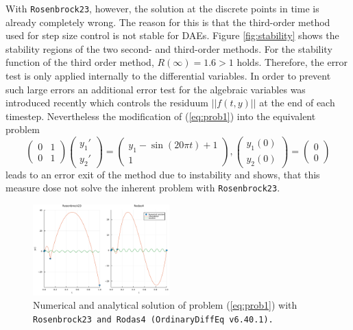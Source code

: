 \documentclass{juliacon}
\begin{document}
With \verb|Rosenbrock23|, however, the solution at the discrete points in time is already completely wrong. 
The reason for this is that the third-order method used for step size control is not stable for DAEs. 
Figure \ref{fig:stability} shows the stability regions of the two second- and third-order methods. For the stability function of the third order method, $R(\infty) = 1.6 >1$ holds. 
Therefore, the error test is only applied internally to the differential variables. In order to prevent such large errors an
additional error test for the algebraic variables was introduced recently which controls the residuum $||f(t,y)||$ at the end of each timestep. 
Nevertheless the modification of (\ref{eq:prob1}) into the equivalent problem
\begin{equation}
\begin{pmatrix} 0&1\\0&1 \end{pmatrix}
\begin{pmatrix} y_1'\\y_2' \end{pmatrix} =
\begin{pmatrix} y_1 - \sin(20 \pi t) + 1 \\ 1 \end{pmatrix} , 
\begin{pmatrix} y_1(0)\\y_2(0) \end{pmatrix} = \begin{pmatrix} 0\\0 \end{pmatrix} 
 \label{eq:prob1a}
\end{equation}
leads to an error exit of the method due to instability and 
shows, that this measure dose not solve the inherent problem with \verb|Rosenbrock23|.

\begin{figure}[t]
\centerline{\includegraphics[width=0.47\textwidth]{Abb_1.pdf}}
\caption{Numerical and analytical solution of problem (\ref{eq:prob1}) with \tt Rosenbrock23 \rm and \tt Rodas4 \rm (OrdinaryDiffEq v6.40.1).}
\label{fig:dynamic}
\end{figure}
\end{document}
